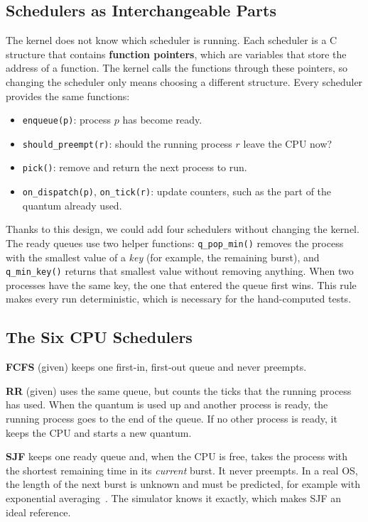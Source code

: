 \subsection{Schedulers as Interchangeable Parts}
The kernel does not know which scheduler is running. Each scheduler is a C structure that contains \textbf{function pointers}, which are variables that store the address of a function. The kernel calls the functions through these pointers, so changing the scheduler only means choosing a different structure. Every scheduler provides the same functions:
\begin{itemize}
    \item \texttt{enqueue(p)}: process $p$ has become ready.
    \item \texttt{should\_preempt(r)}: should the running process $r$ leave the CPU now?
    \item \texttt{pick()}: remove and return the next process to run.
    \item \texttt{on\_dispatch(p)}, \texttt{on\_tick(r)}: update counters, such as the part of the quantum already used.
\end{itemize}
Thanks to this design, we could add four schedulers without changing the kernel. The ready queues use two helper functions: \texttt{q\_pop\_min()} removes the process with the smallest value of a \emph{key} (for example, the remaining burst), and \texttt{q\_min\_key()} returns that smallest value without removing anything. When two processes have the same key, the one that entered the queue first wins. This rule makes every run deterministic, which is necessary for the hand-computed tests.

\subsection{The Six CPU Schedulers}
\textbf{FCFS} (given) keeps one first-in, first-out queue and never preempts.

\textbf{RR} (given) uses the same queue, but counts the ticks that the running process has used. When the quantum is used up and another process is ready, the running process goes to the end of the queue. If no other process is ready, it keeps the CPU and starts a new quantum.

\textbf{SJF} keeps one ready queue and, when the CPU is free, takes the process with the shortest remaining time in its \emph{current} burst. It never preempts. In a real OS, the length of the next burst is unknown and must be predicted, for example with exponential averaging~\cite[Sec.~5.3.2]{silberschatz}. The simulator knows it exactly, which makes SJF an ideal reference.

